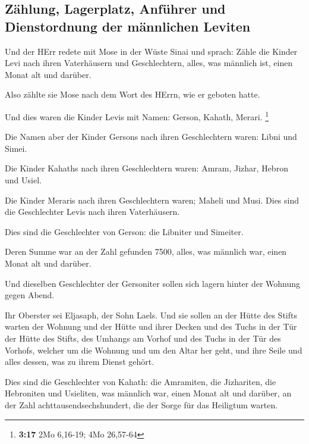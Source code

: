 \hypertarget{zuxe4hlung-lagerplatz-anfuxfchrer-und-dienstordnung-der-muxe4nnlichen-leviten}{%
\subsection{Zählung, Lagerplatz, Anführer und Dienstordnung der
männlichen
Leviten}\label{zuxe4hlung-lagerplatz-anfuxfchrer-und-dienstordnung-der-muxe4nnlichen-leviten}}

 Und der HErr redete mit Mose in der Wüste Sinai und
sprach:  Zähle die Kinder Levi nach ihren Vaterhäusern
und Geschlechtern, alles, was männlich ist, einen Monat alt und darüber.

 Also zählte sie Mose nach dem Wort des HErrn, wie er
geboten hatte.

 Und dies waren die Kinder Levis mit Namen: Gerson,
Kahath, Merari. \footnote{\textbf{3:17} 2Mo 6,16-19; 4Mo 26,57-64}

 Die Namen aber der Kinder Gersons nach ihren
Geschlechtern waren: Libni und Simei.

 Die Kinder Kahaths nach ihren Geschlechtern waren:
Amram, Jizhar, Hebron und Usiel.

 Die Kinder Meraris nach ihren Geschlechtern waren;
Maheli und Musi. Dies sind die Geschlechter Levis nach ihren
Vaterhäusern.

 Dies sind die Geschlechter von Gerson: die Libniter und
Simeiter.

 Deren Summe war an der Zahl gefunden 7500, alles, was
männlich war, einen Monat alt und darüber.

 Und dieselben Geschlechter der Gersoniter sollen sich
lagern hinter der Wohnung gegen Abend.

 Ihr Oberster sei Eljasaph, der Sohn Laels.
 Und sie sollen an der Hütte des Stifts warten der
Wohnung und der Hütte und ihrer Decken und des Tuchs in der Tür der
Hütte des Stifts,  des Umhangs am Vorhof und des Tuchs in
der Tür des Vorhofs, welcher um die Wohnung und um den Altar her geht,
und ihre Seile und alles dessen, was zu ihrem Dienst gehört.

 Dies sind die Geschlechter von Kahath: die Amramiten,
die Jizhariten, die Hebroniten und Usieliten,  was
männlich war, einen Monat alt und darüber, an der Zahl
achttausendsechshundert, die der Sorge für das Heiligtum warten.

